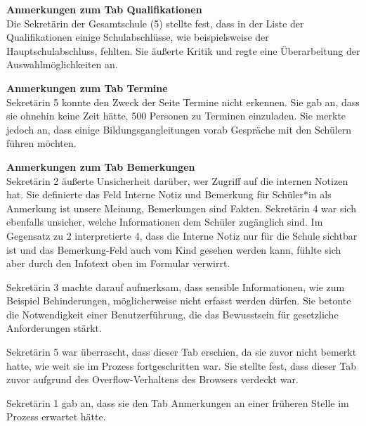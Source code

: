 \textbf{Anmerkungen zum Tab \glqq Qualifikationen\grqq{}}\\
Die Sekretärin der Gesamtschule (5) stellte fest, dass in der Liste der Qualifikationen einige Schulabschlüsse, wie beispielsweise der Hauptschulabschluss, fehlten. Sie äußerte Kritik und regte eine Überarbeitung der Auswahlmöglichkeiten an.

\textbf{Anmerkungen zum Tab \glqq Termine\grqq{}}\\
Sekretärin 5 konnte den Zweck der Seite \glqq Termine\grqq{} nicht erkennen. Sie gab an, dass sie ohnehin keine Zeit hätte, 500 Personen zu Terminen einzuladen. Sie merkte jedoch an, dass einige Bildungsgangleitungen vorab Gespräche mit den Schülern führen möchten.

\textbf{Anmerkungen zum Tab \glqq Bemerkungen\grqq{}}\\
Sekretärin 2 äußerte Unsicherheit darüber, wer Zugriff auf die internen Notizen hat. Sie definierte das Feld \glqq Interne Notiz\grqq{} und \glqq Bemerkung für Schüler*in\grqq{} als \glqq Anmerkung ist unsere Meinung, Bemerkungen sind Fakten\grqq{}. Sekretärin 4 war sich ebenfalls unsicher, welche Informationen dem Schüler zugänglich sind. Im Gegensatz zu 2 interpretierte 4, dass die \glqq Interne Notiz\grqq{} nur für die Schule sichtbar ist und das \glqq Bemerkung\grqq{}-Feld auch vom Kind gesehen werden kann, fühlte sich aber durch den Infotext oben im Formular verwirrt.

Sekretärin 3 machte darauf aufmerksam, dass sensible Informationen, wie zum Beispiel Behinderungen, möglicherweise nicht erfasst werden dürfen. Sie betonte die Notwendigkeit einer Benutzerführung, die das Bewusstsein für gesetzliche Anforderungen stärkt.

Sekretärin 5 war überrascht, dass dieser Tab erschien, da sie zuvor nicht bemerkt hatte, wie weit sie im Prozess fortgeschritten war. Sie stellte fest, dass dieser Tab zuvor aufgrund des Overflow-Verhaltens des Browsers verdeckt war.

Sekretärin 1 gab an, dass sie den Tab \glqq Anmerkungen\grqq{} an einer früheren Stelle im Prozess erwartet hätte.

